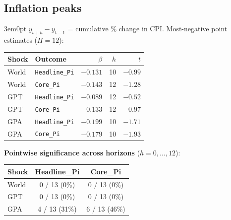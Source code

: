 \documentclass[12pt]{article}
\newenvironment{bodyL2}{\begin{adjustwidth}{3em}{0pt}}{\end{adjustwidth}}
\begin{document}
\subsection{Inflation peaks}
\begin{bodyL2}
$y_{t+h} - y_{t-1}$ = cumulative \% change in CPI. Most-negative point estimates ($H = 12$):

\begin{center}
\renewcommand{\arraystretch}{1.15}
\begin{tabular}{ll rrr}
\toprule
Shock & Outcome & $\beta$ & $h$ & $t$ \\
\midrule
World & \texttt{Headline\_Pi} & $-0.131$ & 10 & $-0.99$ \\
World & \texttt{Core\_Pi}     & $-0.143$ & 12 & $-1.28$ \\
GPT   & \texttt{Headline\_Pi} & $-0.089$ & 12 & $-0.52$ \\
GPT   & \texttt{Core\_Pi}     & $-0.133$ & 12 & $-0.97$ \\
GPA   & \texttt{Headline\_Pi} & $-0.199$ & 10 & $-1.71$ \\
GPA   & \texttt{Core\_Pi}     & $-0.179$ & 10 & $-1.93$ \\
\bottomrule
\end{tabular}
\end{center}

\smallskip
\textbf{Pointwise significance across horizons} ($h = 0, \ldots, 12$):
\begin{center}
\renewcommand{\arraystretch}{1.15}
\small
\begin{tabular}{lcc}
\toprule
Shock & Headline\_Pi & Core\_Pi \\
\midrule
World & 0 / 13 (0\%)  & 0 / 13 (0\%) \\
GPT   & 0 / 13 (0\%)  & 0 / 13 (0\%) \\
GPA   & 4 / 13 (31\%) & 6 / 13 (46\%) \\
\bottomrule
\end{tabular}
\end{center}


\end{bodyL2}
\end{document}
